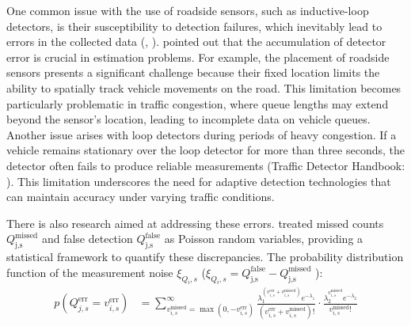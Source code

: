 One common issue with the use of roadside sensors, such as inductive-loop detectors, is their susceptibility to detection failures, which inevitably lead to errors in the collected data (\textcite{mimbela2007summary}, \textcite{lee2012camera}). \textcite{vigos2008real} pointed out that the accumulation of detector error is crucial in estimation problems. For example, the placement of roadside sensors presents a significant challenge because their fixed location limits the ability to spatially track vehicle movements on the road. This limitation becomes particularly problematic in traffic congestion, where queue lengths may extend beyond the sensor's location, leading to incomplete data on vehicle queues. Another issue arises with loop detectors during periods of heavy congestion. If a vehicle remains stationary over the loop detector for more than three seconds, the detector often fails to produce reliable measurements (Traffic Detector Handbook: \textcite{klein2006traffic}). This limitation underscores the need for adaptive detection technologies that can maintain accuracy under varying traffic conditions.


There is also research aimed at addressing these errors. \textcite{mihaylova2007freeway} treated missed counts \( Q_{\text{j,s}}^{\text{missed}} \) and false detection \( Q_{\text{j,s}}^{\text{false}} \) 
 as Poisson random variables, providing a statistical framework to quantify these discrepancies. The probability distribution function of the measurement noise \( \xi_{Q_{i}, s} \) ($\xi_{Q_{i}, s} = Q_{\text{j,s}}^{\text{false}} - Q_{\text{j,s}}^{\text{missed}}$ ): 
 \begin{equation}
\begin{aligned}
    p(Q_{j,s}^{\text{err}} = v_{i,s}^{\text{err}}) &= \sum_{v_{i,s}^{\text{missed}} = \max(0, -v_{i,s}^{\text{err}})}^{\infty} \frac{\lambda_1^{(v_{i,s}^{\text{err}} + v_{i,s}^{\text{missed}})} e^{-\lambda_1}}{(v_{i,s}^{\text{err}} + v_{i,s}^{\text{missed}})!} \cdot \frac{\lambda_2^{v_{i,s}^{\text{missed}}} e^{-\lambda_2}}{v_{i,s}^{\text{missed}}!}
\end{aligned}
\end{equation}

